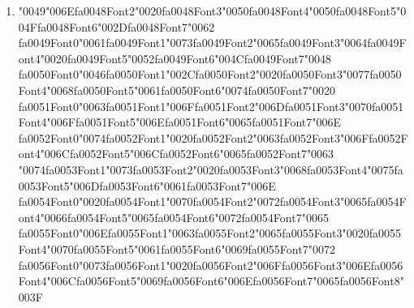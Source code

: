 \documentclass[12pt]{article}
\begin{document}
\begin{enumerate}[label=Q\arabic*.]
\begin{enumerate}[label=(\Alph*)]
\end{enumerate}
\item {\char"0049}{\char"006E}{\csname fa0048Font2\endcsname\char"0020}{\csname fa0048Font3\endcsname\char"0050}{\csname fa0048Font4\endcsname\char"0050}{\csname fa0048Font5\endcsname\char"004F}{\csname fa0048Font6\endcsname\char"002D}{\csname fa0048Font7\endcsname\char"0062} {\csname fa0049Font0\endcsname\char"0061}{\csname fa0049Font1\endcsname\char"0073}{\csname fa0049Font2\endcsname\char"0065}{\csname fa0049Font3\endcsname\char"0064}{\csname fa0049Font4\endcsname\char"0020}{\csname fa0049Font5\endcsname\char"0052}{\csname fa0049Font6\endcsname\char"004C}{\csname fa0049Font7\endcsname\char"0048} {\csname fa0050Font0\endcsname\char"0046}{\csname fa0050Font1\endcsname\char"002C}{\csname fa0050Font2\endcsname\char"0020}{\csname fa0050Font3\endcsname\char"0077}{\csname fa0050Font4\endcsname\char"0068}{\csname fa0050Font5\endcsname\char"0061}{\csname fa0050Font6\endcsname\char"0074}{\csname fa0050Font7\endcsname\char"0020} {\csname fa0051Font0\endcsname\char"0063}{\csname fa0051Font1\endcsname\char"006F}{\csname fa0051Font2\endcsname\char"006D}{\csname fa0051Font3\endcsname\char"0070}{\csname fa0051Font4\endcsname\char"006F}{\csname fa0051Font5\endcsname\char"006E}{\csname fa0051Font6\endcsname\char"0065}{\csname fa0051Font7\endcsname\char"006E} {\csname fa0052Font0\endcsname\char"0074}{\csname fa0052Font1\endcsname\char"0020}{\csname fa0052Font2\endcsname\char"0063}{\csname fa0052Font3\endcsname\char"006F}{\csname fa0052Font4\endcsname\char"006C}{\csname fa0052Font5\endcsname\char"006C}{\csname fa0052Font6\endcsname\char"0065}{\csname fa0052Font7\endcsname\char"0063} {\char"0074}{\csname fa0053Font1\endcsname\char"0073}{\csname fa0053Font2\endcsname\char"0020}{\csname fa0053Font3\endcsname\char"0068}{\csname fa0053Font4\endcsname\char"0075}{\csname fa0053Font5\endcsname\char"006D}{\csname fa0053Font6\endcsname\char"0061}{\csname fa0053Font7\endcsname\char"006E} {\csname fa0054Font0\endcsname\char"0020}{\csname fa0054Font1\endcsname\char"0070}{\csname fa0054Font2\endcsname\char"0072}{\csname fa0054Font3\endcsname\char"0065}{\csname fa0054Font4\endcsname\char"0066}{\csname fa0054Font5\endcsname\char"0065}{\csname fa0054Font6\endcsname\char"0072}{\csname fa0054Font7\endcsname\char"0065} {\csname fa0055Font0\endcsname\char"006E}{\csname fa0055Font1\endcsname\char"0063}{\csname fa0055Font2\endcsname\char"0065}{\csname fa0055Font3\endcsname\char"0020}{\csname fa0055Font4\endcsname\char"0070}{\csname fa0055Font5\endcsname\char"0061}{\csname fa0055Font6\endcsname\char"0069}{\csname fa0055Font7\endcsname\char"0072} {\csname fa0056Font0\endcsname\char"0073}{\csname fa0056Font1\endcsname\char"0020}{\csname fa0056Font2\endcsname\char"006F}{\csname fa0056Font3\endcsname\char"006E}{\csname fa0056Font4\endcsname\char"006C}{\csname fa0056Font5\endcsname\char"0069}{\csname fa0056Font6\endcsname\char"006E}{\csname fa0056Font7\endcsname\char"0065}{\csname fa0056Font8\endcsname\char"003F}

\end{enumerate}
\end{document}
